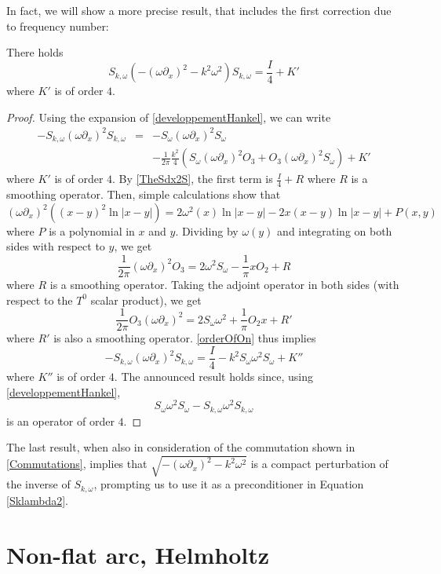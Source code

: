 \documentclass[a4paper]{article}
\begin{document}
In fact, we will show a more precise result, that includes the first correction due to frequency number:
\begin{The} There holds
	\label{TheHelmholtz}
	\[S_{k,\omega} \left( -(\omega \partial_x)^2 - k^2\omega^2\right) S_{k,\omega} = \frac{I}{4} + K'\]
	where $K'$ is of order $4$. 
	\begin{proof}
		Using the expansion of \autoref{developpementHankel}, we can write 
		\begin{eqnarray*}
			-S_{k,\omega}(\omega \partial_x)^2 S_{k,\omega} &=& -S_\omega (\omega \partial_x)^2 S_\omega \\
			&& - \frac{1}{2\pi}\frac{k^2}{4}\left(S_\omega (\omega \partial_x)^2 O_3 + O_3 (\omega \partial_x)^2 S_\omega\right) + K'
		\end{eqnarray*}
		where $K'$ is of order $4$. By \autoref{TheSdx2S}, the first term is $\frac{I}{4} + R$ where $R$ is a smoothing operator. Then, simple calculations show that
		\[(\omega \partial_x)^2 \left((x - y)^2\ln|x-y|\right) = 2 \omega^2(x)\ln|x-y| -2x(x-y) \ln|x-y| + P(x,y)\]
		where $P$ is a polynomial in $x$ and $y$. Dividing by $\omega(y)$ and integrating on both sides with respect to $y$, we get 
		\[\frac{1}{2\pi}(\omega \partial_x)^2 O_3 = 2 \omega^2 S_\omega - \frac{1}{\pi}xO_2 + R \]
		where $R$ is a smoothing operator. Taking the adjoint operator in both sides (with respect to the $T^0$ scalar product), we get
		\[\frac{1}{2\pi}O_3(\omega \partial_x)^2 = 2 S_\omega\omega^2 + \frac{1}{\pi}O_2x + R'\]
		where $R'$ is also a smoothing operator. \autoref{orderOfOn} thus implies
		\[-S_{k,\omega}(\omega \partial_x)^2 S_{k,\omega} = \frac{I}{4} - k^2S_\omega \omega^2 S_\omega + K''\]
		where $K''$ is of order $4$.
		The announced result holds since, using \autoref{developpementHankel}, 
		\[S_\omega \omega^2 S_\omega - S_{k,\omega} \omega^2 S_{k,\omega}\]
		is an operator of order $4$.
	\end{proof}
\end{The}


The last result, when also in consideration of the commutation shown in \autoref{Commutations}, implies that $\sqrt{ -(\omega \partial_x)^2 - k^2\omega^2}$ is a compact perturbation of the inverse of $S_{k,\omega}$, prompting us to use it as a preconditioner in Equation \eqref{Sklambda2}.

\section{Non-flat arc, Helmholtz}
\end{document}
